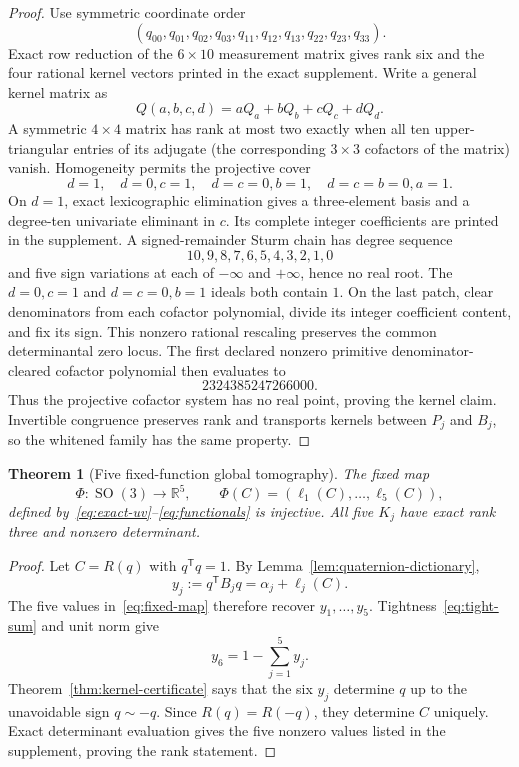 \documentclass[12pt]{article}
\newtheorem{theorem}{Theorem}[section]
\theoremstyle{definition}
\theoremstyle{remark}
\newcommand{\RR}{\mathbb R}
\newcommand{\SO}{\operatorname{SO}}
\begin{document}
\begin{proof}
Use symmetric coordinate order
\[
(q_{00},q_{01},q_{02},q_{03},q_{11},q_{12},q_{13},q_{22},q_{23},q_{33}).
\]
Exact row reduction of the $6\times10$ measurement matrix gives rank six and
the four rational kernel vectors printed in the exact supplement.  Write a
general kernel matrix as
\[
 Q(a,b,c,d)=aQ_a+bQ_b+cQ_c+dQ_d.
\]
A symmetric $4\times4$ matrix has rank at most two exactly when all ten
upper-triangular entries of its adjugate (the corresponding $3\times3$
cofactors of the matrix) vanish.  Homogeneity permits the
projective cover
\[
d=1,\quad d=0,c=1,\quad d=c=0,b=1,\quad d=c=b=0,a=1.
\]
On $d=1$, exact lexicographic elimination gives a three-element basis and a
degree-ten univariate eliminant in $c$.  Its complete integer coefficients
are printed in the supplement.  A signed-remainder Sturm chain has degree
sequence
\[
10,9,8,7,6,5,4,3,2,1,0
\]
and five sign variations at each of $-\infty$ and $+\infty$, hence no real
root.  The $d=0,c=1$ and $d=c=0,b=1$ ideals both contain $1$.  On the last
patch, clear denominators from each cofactor polynomial, divide its integer
coefficient content, and fix its sign.  This nonzero rational rescaling
preserves the common determinantal zero locus.  The first declared nonzero
primitive denominator-cleared cofactor polynomial then evaluates to
\[
2324385247266000.
\]
Thus the projective cofactor system has no real point, proving the kernel
claim.  Invertible congruence preserves rank and transports kernels between
$P_j$ and $B_j$, so the whitened family has the same property.
\end{proof}

\begin{theorem}[Five fixed-function global tomography]\label{thm:fixed-five}
The fixed map
\begin{equation}\label{eq:fixed-map}
 \Phi:\SO(3)\longrightarrow\RR^5,\qquad
 \Phi(C)=(\ell_1(C),\ldots,\ell_5(C)),
\end{equation}
defined by~\eqref{eq:exact-uv}--\eqref{eq:functionals} is injective.
All five $K_j$ have exact rank three and nonzero determinant.
\end{theorem}

\begin{proof}
Let $C=R(q)$ with $q^\mathsf Tq=1$.  By
Lemma~\ref{lem:quaternion-dictionary},
\begin{equation}\label{eq:y-readings}
 y_j:=q^\mathsf TB_jq=\alpha_j+\ell_j(C).
\end{equation}
The five values in~\eqref{eq:fixed-map} therefore recover
$y_1,\ldots,y_5$.  Tightness~\eqref{eq:tight-sum} and unit norm give
\begin{equation}\label{eq:sixth-recovery}
 y_6=1-\sum_{j=1}^5y_j.
\end{equation}
Theorem~\ref{thm:kernel-certificate} says that the six $y_j$ determine $q$
up to the unavoidable sign $q\sim-q$.  Since $R(q)=R(-q)$, they determine
$C$ uniquely.  Exact determinant evaluation gives the five nonzero values
listed in the supplement, proving the rank statement.
\end{proof}
\end{document}
